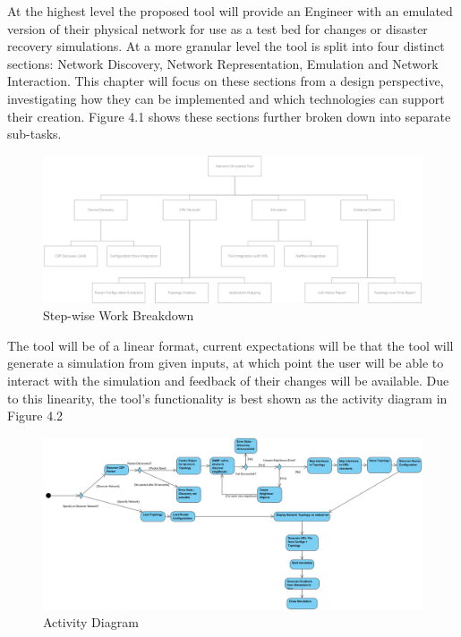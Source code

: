 \documentclass[11pt]{report}
\begin{document}
At the highest level the proposed tool will provide an Engineer with an emulated version of their physical network for use as a test bed for changes or disaster recovery simulations. At a more granular level the tool is split into four distinct sections: Network Discovery, Network Representation, Emulation and Network Interaction. This chapter will focus on these sections from a design perspective, investigating how they can be implemented and which technologies can support their creation. Figure 4.1 shows these sections further broken down into separate sub-tasks.

\begin{figure}[h!]
	\caption{Step-wise Work Breakdown}
	\centering
	\includegraphics[width=1\textwidth]{work-Breakdown.png}
\end{figure}

The tool will be of a linear format, current expectations will be that the tool will generate a simulation from given inputs, at which point the user will be able to interact with the simulation and feedback of their changes will be available. Due to this linearity, the tool's functionality is best shown as the activity diagram in Figure 4.2 

\begin{figure}
	\caption{Activity Diagram}
	\includegraphics[width=1\textwidth]{activityDiagram.png}
\end{figure}
\end{document}
